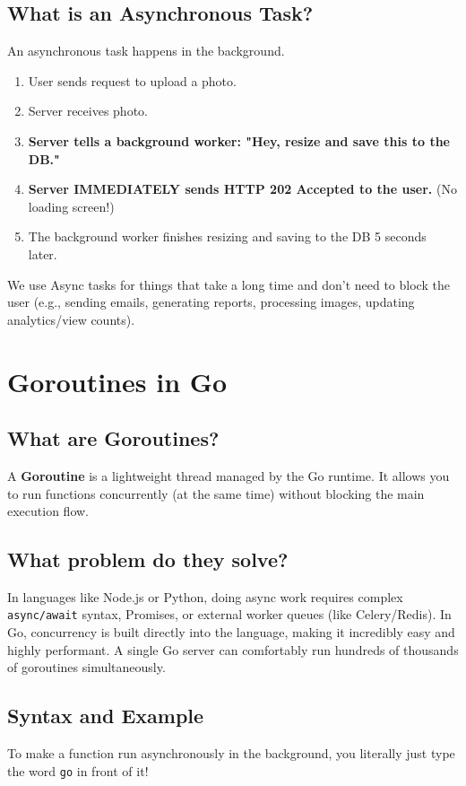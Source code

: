 \documentclass[11pt,a4paper]{article}
\begin{document}
\subsection{What is an Asynchronous Task?}
An asynchronous task happens in the background.
\begin{enumerate}
    \item User sends request to upload a photo.
    \item Server receives photo.
    \item \textbf{Server tells a background worker: "Hey, resize and save this to the DB."}
    \item \textbf{Server IMMEDIATELY sends HTTP 202 Accepted to the user.} (No loading screen!)
    \item The background worker finishes resizing and saving to the DB 5 seconds later.
\end{enumerate}
We use Async tasks for things that take a long time and don't need to block the user (e.g., sending emails, generating reports, processing images, updating analytics/view counts).

\section{Goroutines in Go}
\subsection{What are Goroutines?}
A \textbf{Goroutine} is a lightweight thread managed by the Go runtime. It allows you to run functions concurrently (at the same time) without blocking the main execution flow. 

\subsection{What problem do they solve?}
In languages like Node.js or Python, doing async work requires complex \texttt{async/await} syntax, Promises, or external worker queues (like Celery/Redis). In Go, concurrency is built directly into the language, making it incredibly easy and highly performant. A single Go server can comfortably run hundreds of thousands of goroutines simultaneously.

\subsection{Syntax and Example}
To make a function run asynchronously in the background, you literally just type the word \texttt{go} in front of it!
\end{document}
